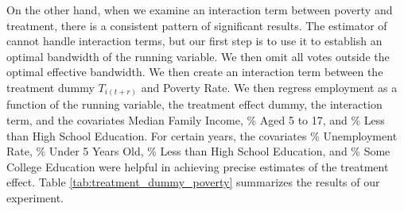 On the other hand, when we examine an interaction term between poverty and treatment, there is a consistent pattern of significant results.  The estimator of \cite{calonico2019regression} cannot handle interaction terms, but our first step is to use it to establish an optimal bandwidth of the running variable.  We then omit all votes outside the optimal effective bandwidth.  We then create an interaction term between the treatment dummy $T_{i(t+r)}$ and Poverty Rate.  We then regress employment as a function of the running variable, the treatment effect dummy, the interaction term, and the covariates Median Family Income, \% Aged 5 to 17, and \% Less than High School Education.  For certain years, the covariates \% Unemployment Rate, \% Under 5 Years Old, \% Less than High School Education, and \% Some College Education were helpful in achieving precise estimates of the treatment effect. Table \ref{tab:treatment_dummy_poverty} summarizes the results of our experiment. 
 
